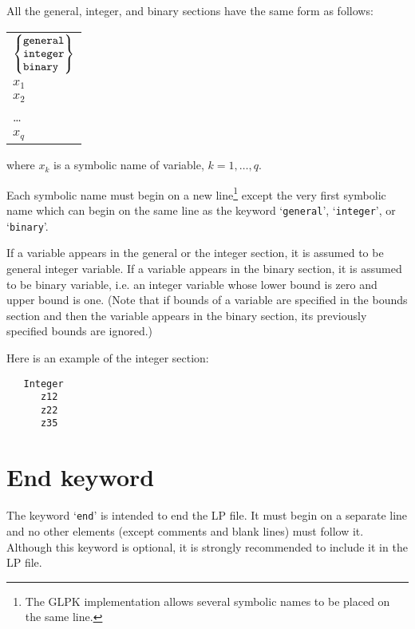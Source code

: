 All the general, integer, and binary sections have the same form as
follows:

\begin{center}
\begin{tabular}{l}
$
\left\{
\begin{array}{@{}l@{}}
\verb|general| \\
\verb|integer| \\
\verb|binary | \\
\end{array}
\right\}
$ \\
\hspace{10pt}$x_1$ \\
\hspace{10pt}$x_2$ \\
\hspace{10pt}\dots \\
\hspace{10pt}$x_q$ \\
\end{tabular}
\end{center}

\noindent
where $x_k$ is a symbolic name of variable, $k=1,\dots,q$.

Each symbolic name must begin on a new line\footnote{The GLPK
implementation allows several symbolic names to be placed on the same
line.} except the very first symbolic name which can begin on the same
line as the keyword `\verb|general|', `\verb|integer|', or
`\verb|binary|'.

\newpage

If a variable appears in the general or the integer section, it is
assumed to be general integer variable. If a variable appears in the
binary section, it is assumed to be binary variable, i.e. an integer
variable whose lower bound is zero and upper bound is one. (Note that
if bounds of a variable are specified in the bounds section and then
the variable appears in the binary section, its previously specified
bounds are ignored.)

Here is an example of the integer section:

\begin{verbatim}
   Integer
      z12
      z22
      z35
\end{verbatim}

\section{End keyword}

The keyword `\verb|end|' is intended to end the LP file. It must begin
on a separate line and no other elements (except comments and blank
lines) must follow it. Although this keyword is optional, it is strongly
recommended to include it in the LP file.

